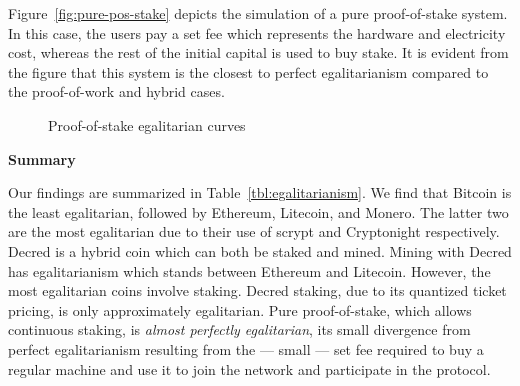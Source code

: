 Figure~\ref{fig:pure-pos-stake} depicts the simulation of a pure proof-of-stake
system. In this case, the users pay a set fee which represents the hardware and
electricity cost, whereas the rest of the initial capital is used to buy stake.
It is evident from the figure that this system is the closest to perfect
egalitarianism compared to the proof-of-work and hybrid cases.

\begin{figure}
  \caption{Proof-of-stake egalitarian curves}
  \label{fig:egalitarian_curves_pos}
\end{figure}

\noindent\textbf{Summary}

\noindent
Our findings are summarized in Table~\ref{tbl:egalitarianism}. We find that
Bitcoin is the least egalitarian, followed by Ethereum, Litecoin, and Monero.
The latter two are the most egalitarian due to their use of scrypt and
Cryptonight respectively. Decred is a hybrid coin which can both be staked and
mined. Mining with Decred has egalitarianism which stands between Ethereum and
Litecoin. However, the most egalitarian coins involve staking. Decred staking,
due to its quantized ticket pricing, is only approximately egalitarian. Pure
proof-of-stake, which allows continuous staking, is \emph{almost perfectly
egalitarian}, its small divergence from perfect egalitarianism resulting from
the --- small --- set fee required to buy a regular machine and use it to join
the network and participate in the protocol.


